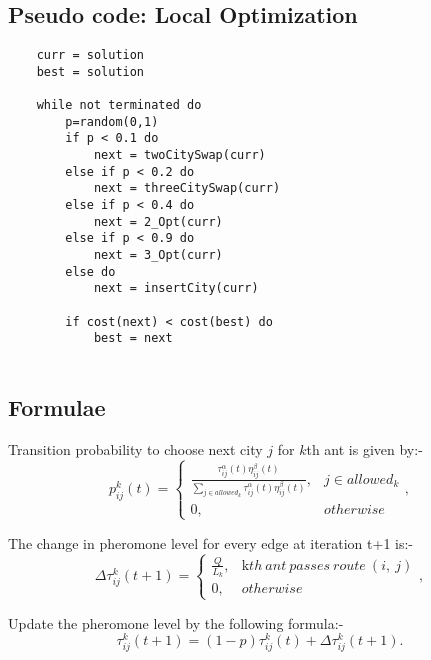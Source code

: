 \documentclass[11pt,a4paper]{article}
\begin{document}
\subsection{Pseudo code: Local Optimization}
\begin{verbatim}
    curr = solution
    best = solution
    
    while not terminated do
        p=random(0,1)
        if p < 0.1 do 
            next = twoCitySwap(curr)
        else if p < 0.2 do 
            next = threeCitySwap(curr)
        else if p < 0.4 do 
            next = 2_Opt(curr)
        else if p < 0.9 do 
            next = 3_Opt(curr)
        else do
            next = insertCity(curr)
        
        if cost(next) < cost(best) do
            best = next
        
\end{verbatim}
\subsection{Formulae}
Transition probability to choose next city $j$ for $k$th ant is given by:-
\begin{equation*} p_{ij}^{k}(t)=\begin{cases} \displaystyle \frac{\tau_{ij}^{\alpha}(t)\eta_{ij}^{\beta}(t)}{\sum_{j\in allowed_{k}}\tau^{\alpha}_{ij}(t)\eta_{ij}^{\beta}(t)}, & j\in allowed_{k}\\ 0, & otherwise \end{cases}, \tag{1} \end{equation*}

The change in pheromone level for every edge at iteration t+1 is:-
\begin{equation*} \Delta\tau_{ij}^{k}(t+1)=\begin{cases} \frac{Q}{L_{k}}, & \text{k}th\ ant\ passes\ route\ (i, \ j)\\ 0, & otherwise \end{cases}, \tag{2} \end{equation*}

Update the pheromone level by the following formula:-
\begin{equation*} \tau_{ij}^{k}(t+1)=(1-p)\tau_{ij}^{k}(t)+\Delta\tau_{ij}^{k}(t+1). \tag{3} \end{equation*}




\end{document}
